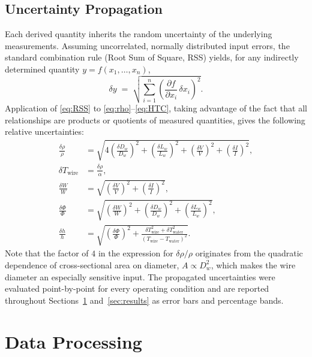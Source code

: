 \documentclass[conference]{IEEEtran}
\begin{document}
\subsection{Uncertainty Propagation}
Each derived quantity inherits the random uncertainty of the underlying measurements. Assuming uncorrelated, normally distributed input errors, the standard combination rule (Root Sum of Square, RSS) yields, for any indirectly determined quantity $y = f(x_1,\ldots,x_n)$,
\begin{equation}
\delta y \;=\; \sqrt{\sum_{i=1}^{n}\!\left(\frac{\partial f}{\partial x_i}\,\delta x_i\right)^{2}}.
\label{eq:RSS}
\end{equation}
Application of \eqref{eq:RSS} to \eqref{eq:rho}--\eqref{eq:HTC}, taking advantage of the fact that all relationships are products or quotients of measured quantities, gives the following relative uncertainties:
\begin{align}
\frac{\delta\rho}{\rho} &= \sqrt{4\!\left(\tfrac{\delta D_w}{D_w}\right)^{2}+\!\left(\tfrac{\delta L_w}{L_w}\right)^{2}+\!\left(\tfrac{\delta V}{V}\right)^{2}+\!\left(\tfrac{\delta I}{I}\right)^{2}},\\
\delta T_{\mathrm{wire}} &= \frac{\delta\rho}{\alpha},\\
\frac{\delta W}{W} &= \sqrt{\!\left(\tfrac{\delta V}{V}\right)^{2}+\!\left(\tfrac{\delta I}{I}\right)^{2}},\\
\frac{\delta \Phi}{\Phi} &= \sqrt{\!\left(\tfrac{\delta W}{W}\right)^{2}+\!\left(\tfrac{\delta D_w}{D_w}\right)^{2}+\!\left(\tfrac{\delta L_w}{L_w}\right)^{2}},\\
\frac{\delta h}{h} &= \sqrt{\!\left(\tfrac{\delta \Phi}{\Phi}\right)^{2}+\frac{\delta T_{\mathrm{wire}}^{2}+\delta T_{\mathrm{water}}^{2}}{\left(T_{\mathrm{wire}}-T_{\mathrm{water}}\right)^{2}}}.
\end{align}
Note that the factor of $4$ in the expression for $\delta\rho/\rho$ originates from the quadratic dependence of cross-sectional area on diameter, $A \propto D_w^{2}$, which makes the wire diameter an especially sensitive input. The propagated uncertainties were evaluated point-by-point for every operating condition and are reported throughout Sections~\ref{sec:dp} and~\ref{sec:results} as error bars and percentage bands.

\section{Data Processing}
\label{sec:dp}
\end{document}
